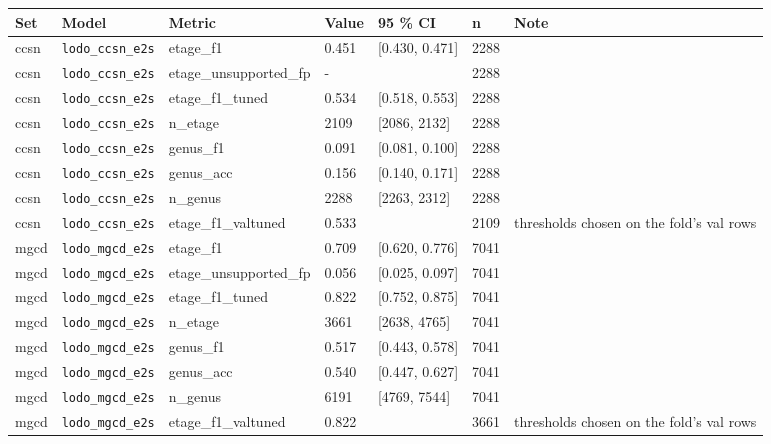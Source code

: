 \begin{center}{\scriptsize\setlength{\tabcolsep}{3pt}
\begin{tabular}{llllllp{7.3cm}}
\toprule
Set & Model & Metric & Value & 95 \% CI & n & Note \\
\midrule
ccsn & \texttt{lodo\_\allowbreak{}ccsn\_\allowbreak{}e2s} & etage\_f1 & 0.451 & [0.430, 0.471] & 2288 &  \\
ccsn & \texttt{lodo\_\allowbreak{}ccsn\_\allowbreak{}e2s} & etage\_unsupported\_fp & - &  & 2288 &  \\
ccsn & \texttt{lodo\_\allowbreak{}ccsn\_\allowbreak{}e2s} & etage\_f1\_tuned & 0.534 & [0.518, 0.553] & 2288 &  \\
ccsn & \texttt{lodo\_\allowbreak{}ccsn\_\allowbreak{}e2s} & n\_etage & 2109 & [2086, 2132] & 2288 &  \\
ccsn & \texttt{lodo\_\allowbreak{}ccsn\_\allowbreak{}e2s} & genus\_f1 & 0.091 & [0.081, 0.100] & 2288 &  \\
ccsn & \texttt{lodo\_\allowbreak{}ccsn\_\allowbreak{}e2s} & genus\_acc & 0.156 & [0.140, 0.171] & 2288 &  \\
ccsn & \texttt{lodo\_\allowbreak{}ccsn\_\allowbreak{}e2s} & n\_genus & 2288 & [2263, 2312] & 2288 &  \\
ccsn & \texttt{lodo\_\allowbreak{}ccsn\_\allowbreak{}e2s} & etage\_f1\_valtuned & 0.533 &  & 2109 & thresholds chosen on the fold's val rows \\
mgcd & \texttt{lodo\_\allowbreak{}mgcd\_\allowbreak{}e2s} & etage\_f1 & 0.709 & [0.620, 0.776] & 7041 &  \\
mgcd & \texttt{lodo\_\allowbreak{}mgcd\_\allowbreak{}e2s} & etage\_unsupported\_fp & 0.056 & [0.025, 0.097] & 7041 &  \\
mgcd & \texttt{lodo\_\allowbreak{}mgcd\_\allowbreak{}e2s} & etage\_f1\_tuned & 0.822 & [0.752, 0.875] & 7041 &  \\
mgcd & \texttt{lodo\_\allowbreak{}mgcd\_\allowbreak{}e2s} & n\_etage & 3661 & [2638, 4765] & 7041 &  \\
mgcd & \texttt{lodo\_\allowbreak{}mgcd\_\allowbreak{}e2s} & genus\_f1 & 0.517 & [0.443, 0.578] & 7041 &  \\
mgcd & \texttt{lodo\_\allowbreak{}mgcd\_\allowbreak{}e2s} & genus\_acc & 0.540 & [0.447, 0.627] & 7041 &  \\
mgcd & \texttt{lodo\_\allowbreak{}mgcd\_\allowbreak{}e2s} & n\_genus & 6191 & [4769, 7544] & 7041 &  \\
mgcd & \texttt{lodo\_\allowbreak{}mgcd\_\allowbreak{}e2s} & etage\_f1\_valtuned & 0.822 &  & 3661 & thresholds chosen on the fold's val rows \\

\end{tabular}}
\end{center}
